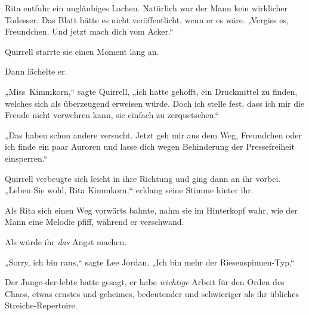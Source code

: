 Rita entfuhr ein ungläubiges Lachen. Natürlich war der Mann kein wirklicher Todesser. Das Blatt hätte es nicht veröffentlicht, wenn er es wäre. „Vergiss es, Freundchen. Und jetzt mach dich vom Acker.“

Quirrell starrte sie einen Moment lang an.

Dann lächelte er.

„Miss~Kimmkorn,“ sagte Quirrell, „ich hatte gehofft, ein Druckmittel zu finden, welches sich als überzeugend erweisen würde. Doch ich stelle fest, dass ich mir die Freude nicht verwehren kann, sie einfach zu zerquetschen.“

„Das haben schon andere versucht. Jetzt geh mir aus dem Weg, Freundchen oder ich finde ein paar Auroren und lasse dich wegen Behinderung der Pressefreiheit einsperren.“

Quirrell verbeugte sich leicht in ihre Richtung und ging dann an ihr vorbei. „Leben Sie wohl, Rita Kimmkorn,“ erklang seine Stimme hinter ihr.

Als Rita sich einen Weg vorwärts bahnte, nahm sie im Hinterkopf wahr, wie der Mann eine Melodie pfiff, während er verschwand.

Als würde ihr \emph{das} Angst machen.


„Sorry, ich bin raus,“ sagte Lee Jordan. „Ich bin mehr der Riesenspinnen-Typ.“

Der Junge-der-lebte hatte gesagt, er habe \emph{wichtige} Arbeit für den Orden des Chaos, etwas ernstes und geheimes, bedeutender und schwieriger als ihr übliches Streiche-Repertoire.

